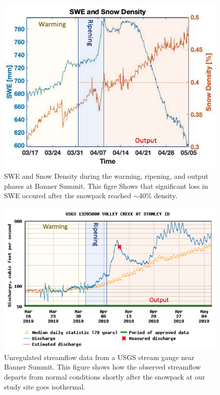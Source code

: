   \begin{figure}
    \centering
    \includegraphics[width=0.8\linewidth]{figures/RunoffTiming/SWE_Density.png}
    \caption{SWE and Snow Density during the warming, ripening, and output phases at Banner Summit. This figre Shows that significant loss in SWE occured after the snowpack reached $\sim$40\% density.}
    \label{fig:SWE_Density}
 \end{figure}

\begin{figure}
    \centering
    \includegraphics[width=1\linewidth]{figures/RunoffTiming/HydrographPhases.png}
    \caption{Unregulated streamflow data from a USGS stream gauge near Banner Summit. This figure shows how the observed streamflow departs from normal conditions shortly after the snowpack at our study site goes isothermal.}
    \label{fig:HydrographPhases}
 \end{figure}




